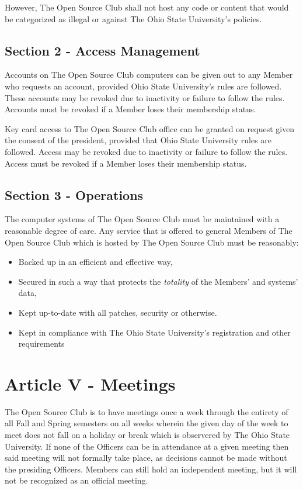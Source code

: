 \documentclass{article}
\begin{document}
  However, The Open Source Club shall not host any code or content that would be categorized as illegal or against The Ohio State University's policies.

  \subsection{Section 2 - Access Management}

	Accounts on The Open Source Club computers can be given out to any Member who requests an account, provided Ohio State University's rules are followed.  These accounts may be revoked due to inactivity or failure to follow the rules. Accounts must be revoked if a Member loses their membership status.

  Key card access to The Open Source Club office can be granted on request given the consent of the president, provided that Ohio State University rules are followed.  Access may be revoked due to inactivity or failure to follow the rules. Access must be revoked if a Member loses their membership status.

  \subsection{Section 3 - Operations}

  The computer systems of The Open Source Club must be maintained with a reasonable degree of care. Any service that is offered to general Members of The Open Source Club which is hosted by The Open Source Club must be reasonably:  

  \begin{itemize}
    \item Backed up in an efficient and effective way,
    \item Secured in such a way that protects the \textit{totality} of the Members' and systems' data,
    \item Kept up-to-date with all patches, security or otherwise.
    \item Kept in compliance with The Ohio State University's registration and other requirements
  \end{itemize}

	\section{Article V - Meetings}

  The Open Source Club is to have meetings once a week through the entirety of all Fall and Spring semesters on all weeks wherein the given day of the week to meet does not fall on a holiday or break which is observered by The Ohio State University. If none of the Officers can be in attendance at a given meeting then said meeting will not formally take place, as decisions cannot be made without the presiding Officers. Members can still hold an independent meeting, but it will not be recognized as an official meeting.
\end{document}
